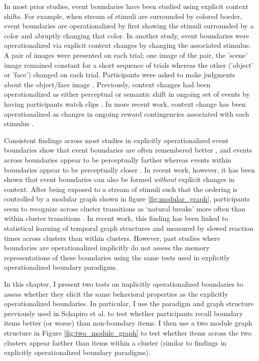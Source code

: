 In most prior studies, event boundaries have been studied using explicit context shifts. For example, when stream of stimuli are surrounded by colored border, event boundaries are operationalized by first showing the stimuli surrounded by a color and abruptly changing that color\cite{heusser2018perceptual}. In another study, event boundaries were operationalized via explicit context changes by changing the associated stimulus\cite{ezzyat2014similarity}. A pair of images were presented on each trial; one image of the pair, the 'scene' image remained constant for a short sequence of trials whereas the other ('object' or 'face') changed on each trial. Participants were asked to make judgments about the object/face image \cite{ezzyat2014similarity}. Previously, context changes had been operationalized as either perceptual or semantic shift in ongoing set of events by having participants watch clips \cite{swallow2009event}. In more recent work, context change has been operationalized as changes in ongoing reward contingencies associated with each stimulus \cite{rouhani2020reward}. 

Consistent findings across most studies in explicitly operationalized event boundaries show that event boundaries are often remembered better \cite{swallow2009event, radvansky2017event, heusser2018perceptual,clewett2019transcending, rouhani2020reward,ezzyat2014similarity}, and events across boundaries appear to be perceptually farther whereas events within boundaries appear to be perceptually closer \cite{clewett2019transcending,ezzyat2014similarity,brunec2018boundaries,lositsky2016neural}. In recent work, however, it has been shown that event boundaries can also be formed \textit{without} explicit changes in context. After being exposed to a stream of stimuli such that the ordering is controlled by a modular graph shown in figure \ref{fig:modular_graph}, participants seem to recognize across cluster transitions as `natural breaks' more often than within cluster transitions \cite{schapiro2013neural}. In recent work, this finding has been linked to statistical learning of temporal graph structures \cite{karuza2022value,karuza2019human,kahn2018network,kahn2018network,lynn2020abstract,lynn2020human,lynn2020humans} and measured by slowed reaction times across clusters than within clusters. However, past studies where boundaries are operationalized implicitly do not assess the memory representations of these boundaries using the same tests used in explicitly operationalized boundary paradigms. 

In this chapter, I present two tests on implicitly operationalized boundaries to assess whether they elicit the same behavioral properties as the explicitly operationalized boundaries. In particular, I use the paradigm and graph structure previously used in Schapiro et al. \cite{schapiro2013neural} to test whether participants recall boundary items better (or worse) than non-boundary items. I then use a two module graph structure in Figure \ref{fig:two_module_graph} to test whether items across the two clusters appear farther than items within a cluster (similar to findings in explicitly operationalized boundary paradigms). 

